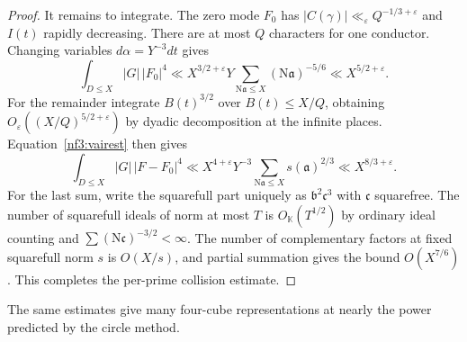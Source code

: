 \documentclass[11pt,letterpaper]{article}
\theoremstyle{definition}
\numberwithin{equation}{section}
\begin{document}
\begin{proof}
It remains to integrate. The zero mode $F_0$ has
$|C(\gamma)|\ll_\varepsilon Q^{-1/3+\varepsilon}$ and $I(t)$
rapidly decreasing. There are at most $Q$ characters for one conductor.
Changing variables $d\alpha=Y^{-3}dt$ gives
\[
 \int_{D\le X}|G|\,|F_0|^4\ll
 X^{3/2+\varepsilon}Y\sum_{\mathrm N\mathfrak a\le X}
                       (\mathrm N\mathfrak a)^{-5/6}
 \ll X^{5/2+\varepsilon}.
\]
For the remainder integrate $B(t)^{3/2}$ over $B(t)\le X/Q$,
obtaining $O_\varepsilon((X/Q)^{5/2+\varepsilon})$ by dyadic
decomposition at the infinite places. Equation~\eqref{nf3:vairest}
then gives
\[
 \int_{D\le X}|G|\,|F-F_0|^4
 \ll X^{4+\varepsilon}Y^{-3}
       \sum_{\mathrm N\mathfrak a\le X}s(\mathfrak a)^{2/3}
 \ll X^{8/3+\varepsilon}.
\]
For the last sum, write the squarefull part uniquely as
$\mathfrak b^2\mathfrak c^3$ with $\mathfrak c$ squarefree. The number
of squarefull ideals of norm at most $T$ is $O_{\mathbb K}(T^{1/2})$ by
ordinary ideal counting and $\sum (\mathrm N\mathfrak c)^{-3/2}<\infty$.
The number of complementary factors at fixed squarefull norm $s$ is
$O(X/s)$, and partial summation gives the bound $O(X^{7/6})$.
This completes the per-prime collision estimate.
\end{proof}

The same estimates give many four-cube representations at nearly the
power predicted by the circle method.
\end{document}
